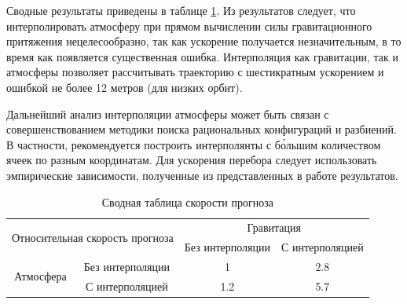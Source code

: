 Сводные результаты приведены в таблице \ref{tab:atmo_propag_acc}. Из результатов следует, что интерполировать атмосферу
при прямом вычислении силы гравитационного притяжения нецелесообразно, так как ускорение
получается незначительным, в то время как появляется существенная ошибка. Интерполяция
как гравитации, так и атмосферы позволяет рассчитывать траекторию с шестикратным ускорением и
ошибкой не более 12 метров (для низких орбит).

Дальнейший анализ интерполяции атмосферы может быть связан с совершенствованием методики
поиска рациональных конфигураций и разбиений. В частности, рекомендуется
построить интерполянты с б\`{о}льшим количеством ячеек по разным координатам. Для ускорения
перебора следует использовать эмпирические зависимости, полученные из представленных в работе
результатов.

\begin{table}[h!]
    \caption{Сводная таблица скорости прогноза}
    \centering
    \renewcommand{\arraystretch}{1.5}
    \begin{tabular}{|cc|cc|}
    \hline
    \multicolumn{2}{|c|}{\multirow{2}{*}{Относительная скорость прогноза}} & \multicolumn{2}{c|}{Гравитация}                         \\ \cline{3-4} 
    \multicolumn{2}{|c|}{}                                                 & \multicolumn{1}{c|}{Без интерполяции} & С интерполяцией \\ \hline
    \multicolumn{1}{|c|}{\multirow{2}{*}{Атмосфера}}   & Без интерполяции  & \multicolumn{1}{c|}{1}                & 2.8             \\ \cline{2-4} 
    \multicolumn{1}{|c|}{}                             & С интерполяцией   & \multicolumn{1}{c|}{1.2}              & 5.7             \\ \hline
    \end{tabular}
    \label{tab:atmo_propag_acc}
\end{table}
\clearpage